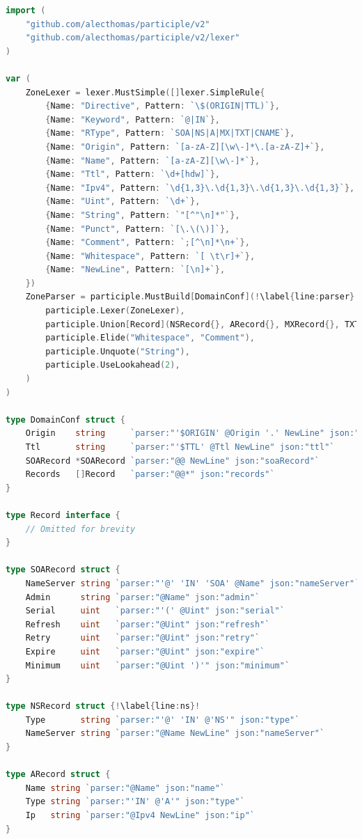 \begin{lstlisting}[frame=single, language=Go, escapechar=!, caption=Implementación en Go del \textit{parser} para los archivos de zona.]
import (
    "github.com/alecthomas/participle/v2"
	"github.com/alecthomas/participle/v2/lexer"
)

var (
    ZoneLexer = lexer.MustSimple([]lexer.SimpleRule{
        {Name: "Directive", Pattern: `\$(ORIGIN|TTL)`},
        {Name: "Keyword", Pattern: `@|IN`},
        {Name: "RType", Pattern: `SOA|NS|A|MX|TXT|CNAME`},
        {Name: "Origin", Pattern: `[a-zA-Z][\w\-]*\.[a-zA-Z]+`},
        {Name: "Name", Pattern: `[a-zA-Z][\w\-]*`},
        {Name: "Ttl", Pattern: `\d+[hdw]`},
        {Name: "Ipv4", Pattern: `\d{1,3}\.\d{1,3}\.\d{1,3}\.\d{1,3}`},
        {Name: "Uint", Pattern: `\d+`},
        {Name: "String", Pattern: `"[^"\n]*"`},
        {Name: "Punct", Pattern: `[\.\(\)]`},
        {Name: "Comment", Pattern: `;[^\n]*\n+`},
        {Name: "Whitespace", Pattern: `[ \t\r]+`},
        {Name: "NewLine", Pattern: `[\n]+`},
    })
    ZoneParser = participle.MustBuild[DomainConf](!\label{line:parser}!
        participle.Lexer(ZoneLexer),
        participle.Union[Record](NSRecord{}, ARecord{}, MXRecord{}, TXTRecord{}, CNAMERecord{}),!\label{line:union-gen}!
        participle.Elide("Whitespace", "Comment"),
        participle.Unquote("String"),
        participle.UseLookahead(2),
    )
)

type DomainConf struct {
	Origin    string     `parser:"'$ORIGIN' @Origin '.' NewLine" json:"origin"`
	Ttl       string     `parser:"'$TTL' @Ttl NewLine" json:"ttl"`
	SOARecord *SOARecord `parser:"@@ NewLine" json:"soaRecord"`
	Records   []Record   `parser:"@@*" json:"records"`
}

type Record interface {
    // Omitted for brevity
}

type SOARecord struct {
	NameServer string `parser:"'@' 'IN' 'SOA' @Name" json:"nameServer"`
	Admin      string `parser:"@Name" json:"admin"`
	Serial     uint   `parser:"'(' @Uint" json:"serial"`
	Refresh    uint   `parser:"@Uint" json:"refresh"`
	Retry      uint   `parser:"@Uint" json:"retry"`
	Expire     uint   `parser:"@Uint" json:"expire"`
	Minimum    uint   `parser:"@Uint ')'" json:"minimum"`
}

type NSRecord struct {!\label{line:ns}!
	Type       string `parser:"'@' 'IN' @'NS'" json:"type"`
	NameServer string `parser:"@Name NewLine" json:"nameServer"`
}

type ARecord struct {
	Name string `parser:"@Name" json:"name"`
	Type string `parser:"'IN' @'A'" json:"type"`
	Ip   string `parser:"@Ipv4 NewLine" json:"ip"`
}


\end{lstlisting}
